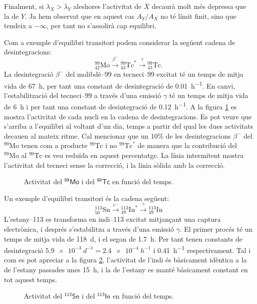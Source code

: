 \documentclass[12pt,a4paper]{article}
\begin{document}
Finalment, si \( \lambda_X > \lambda_Y \) aleshores l'activitat de \( X \) decaurà molt més depressa que la de \( Y \). Ja hem observat que en aquest cas \( A_Y/A_X \) no té límit finit, sino que tendeix a \( -\infty \), per tant no s'assolirà cap equilibri. 

Com a exemple d'equilibri transitori podem considerar la següent cadena de desintegracions:
\begin{equation*}
	{}_{42}^{99} \mathrm{Mo} \xrightarrow{\beta^-} {}_{43}^{99} \mathrm{Tc}^{\ast} \xrightarrow{\gamma} {}_{43}^{99} \mathrm{Tc}.
\end{equation*}
La desintegració \( \beta^- \) del molibdè--99 en tecneci--99 excitat té un temps de mitja vida de \SI{67}{h}, per tant una constant de desintegració de \SI{0.01}{h^{-1}}. En canvi, l'estabilització del tecneci--99 a través d'una emissió \( \gamma \) té un temps de mitja vida de \SI{6}{h} i per tant una constant de desintegració de \SI{0.12}{h^{-1}}. A la figura \ref{fig:equilibri transitori} es mostra l'activitat de cada nucli en la cadena de desintegracions. Es pot veure que s'arriba a l'equilibri al voltant d'un dia, temps a partir del qual les dues activitats decauen al mateix ritme. Cal mencionar que un \num{10}\% de les desintegracions \( \beta^- \) del \( {}^{99}\text{Mo} \) tenen com a producte \( {}^{99}\text{Tc} \) i no \( {}^{99}\text{Tc}^{\ast} \) de manera que la contribució del \(  {}^{99}\text{Mo} \) al \( {}^{99}\text{Tc} \) es veu reduïda en aquest percentatge. La línia intermitent mostra l'activitat del tecneci sense la correcció, i la línia sòlida amb la correcció.
\begin{figure}
	\center
	
	\caption{Activitat del \( \mathsf{{}^{99}\text{Mo}} \) i del \( \mathsf{{}^{99}\text{Tc}} \) en funció del temps.}
	\label{fig:equilibri transitori}
\end{figure}

Un exemple d'equilibri transitori és la cadena següent:
\begin{equation*}
	{}^{113}_{50}\text{Sn} \xrightarrow{e^-} {}^{113}_{49}\text{In}^{\ast} \xrightarrow{\gamma} {}^{113}_{49}\text{In}
\end{equation*}
L'estany--113 es transforma en indi--113 excitat mitjançant una captura electrònica, i després s'estabilitza a través d'una emissió \( \gamma \). El primer procés té un temps de mitja vida de \SI{118}{d}, i el segon de \SI{1.7}{h}. Per tant tenen constants de desintegració \( \SI{5.9e-3}{d^{-1}} = \SI{2.4e-4}{h^{-1}} \) i \SI{0.41}{h^{-1}} respectivament. Tal i com es pot apreciar a la figura \ref{fig:equilibri secular}, l'activitat de l'indi és bàsicament idèntica a la de l'estany passades unes \SI{15}{h}, i la de l'estany es manté bàsicament constant en tot aquest temps. 
\begin{figure}
	\center
	
	\caption{Activitat del \( \mathsf{{}^{113}\text{Sn}} \) i del \( \mathsf{{}^{113}\text{In}} \) en funció del temps.}
	\label{fig:equilibri secular}
\end{figure}
\end{document}
